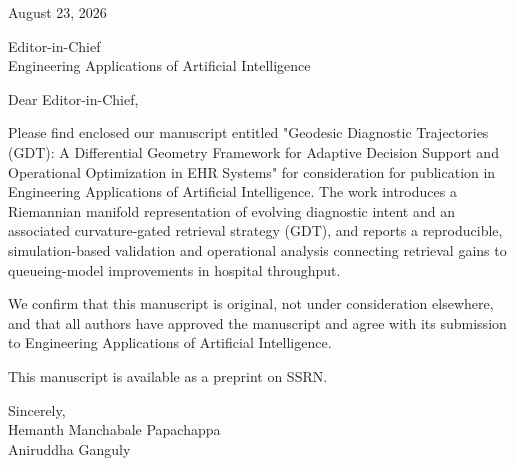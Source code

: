 \documentclass[11pt]{article}
\begin{document}
\begin{flushright}
August 23, 2026\\
\end{flushright}

Editor-in-Chief\\
Engineering Applications of Artificial Intelligence\\
\vspace{1em}

Dear Editor-in-Chief,

\vspace{0.5em}

Please find enclosed our manuscript entitled "Geodesic Diagnostic Trajectories (GDT): A Differential Geometry Framework for Adaptive Decision Support and Operational Optimization in EHR Systems" for consideration for publication in Engineering Applications of Artificial Intelligence. The work introduces a Riemannian manifold representation of evolving diagnostic intent and an associated curvature-gated retrieval strategy (GDT), and reports a reproducible, simulation-based validation and operational analysis connecting retrieval gains to queueing-model improvements in hospital throughput.

We confirm that this manuscript is original, not under consideration elsewhere, and that all authors have approved the manuscript and agree with its submission to Engineering Applications of Artificial Intelligence.

\vspace{0.5em}

This manuscript is available as a preprint on SSRN.


Sincerely,\\

Hemanth Manchabale Papachappa\\
Aniruddha Ganguly
\end{document}
